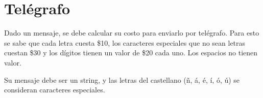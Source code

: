 \section{Telégrafo}

Dado un mensaje, se debe calcular su costo para enviarlo por telégrafo.
Para esto se sabe que cada letra cuesta \$10, los caracteres especiales
que no sean letras cuestan \$30 y los dígitos tienen un valor de \$20
cada uno. Los espacios no tienen valor.

Su mensaje debe ser un string, y las letras del castellano (ñ, á, é, í,
ó, ú) se consideran caracteres especiales.
